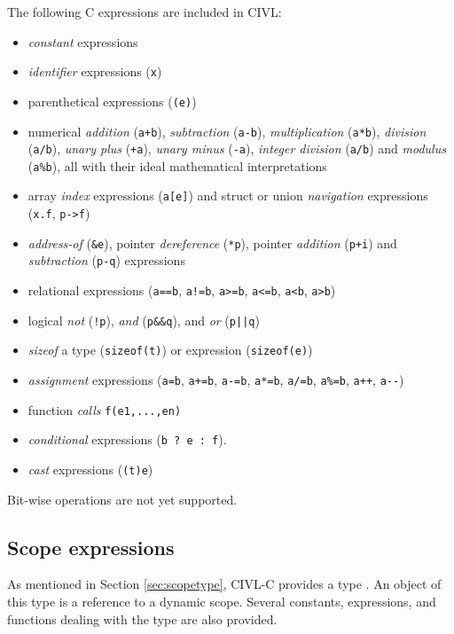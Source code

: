The following C expressions are included in CIVL: 
\begin{itemize}
\item \emph{constant} expressions
\item \emph{identifier} expressions (\texttt{x})
\item parenthetical expressions (\verb!(e)!)
\item numerical \emph{addition} (\verb!a+b!), \emph{subtraction} (\verb!a-b!),
  \emph{multiplication} (\verb!a*b!), \emph{division} (\verb!a/b!),
  \emph{unary plus} (\verb!+a!), \emph{unary minus} (\verb!-a!),
  \emph{integer division} (\verb!a/b!) and \emph{modulus} (\verb!a%b!),
  all with their ideal mathematical interpretations
\item array \emph{index} expressions (\verb!a[e]!) and struct or union
  \emph{navigation} expressions (\verb!x.f!, \verb!p->f!)
\item \emph{address-of} (\verb!&e!), pointer \emph{dereference} (\verb!*p!),
  pointer \emph{addition} (\verb!p+i!) and \emph{subtraction} (\verb!p-q!)
  expressions
\item relational expressions (\verb!a==b!, \verb~a!=b~, \verb!a>=b!,
  \verb!a<=b!, \verb!a<b!, \verb!a>b!)
\item logical \emph{not} (\verb~!p~), \emph{and} (\verb!p&&q!), and
  \emph{or} (\verb!p||q!)
\item \emph{sizeof} a type (\verb!sizeof(t)!) or expression (\verb!sizeof(e)!)
\item \emph{assignment} expressions (\verb!a=b!, \verb!a+=b!, \verb!a-=b!,
  \verb!a*=b!, \verb!a/=b!, \verb!a%=b!, \verb!a++!, \verb!a--!)
\item function \emph{calls} \verb!f(e1,...,en)!
\item \emph{conditional} expressions (\verb!b ? e : f!).
\item \emph{cast} expressions (\verb!(t)e!)
\end{itemize}

Bit-wise operations are not yet supported.

\subsection{Scope expressions}
\label{sec:scopeexpr}

As mentioned in Section \ref{sec:scopetype}, CIVL-C provides a type
\cscope.  An object of this type is a reference to a dynamic scope.
Several constants, expressions, and functions dealing with the
\cscope{} type are also provided.

